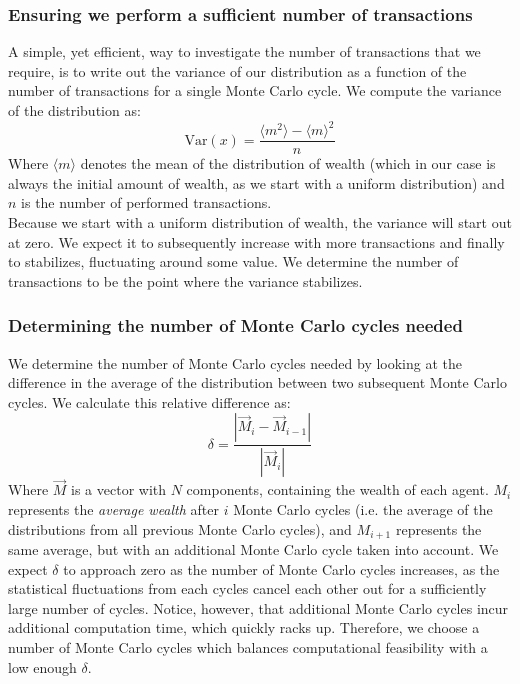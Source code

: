 \documentclass[a4paper, 10pt]{article}
\begin{document}
\subsubsection{Ensuring we perform a sufficient number of transactions}
A simple, yet efficient, way to investigate the number of transactions that we require, is to write out the variance of our distribution as a function of the number of transactions for a single Monte Carlo cycle. We compute the variance of the distribution as:
\begin{equation}
\mathrm{Var}(x)=\frac{\langle m^2 \rangle - \langle m \rangle^2 }{n}
\end{equation}
Where $\langle m \rangle$ denotes the mean of the distribution of wealth (which in our case is always the initial amount of wealth, as we start with a uniform distribution) and $n$ is the number of performed transactions.\\
\linebreak
Because we start with a uniform distribution of wealth, the variance will start out at zero. We expect it to subsequently increase with more transactions and finally to stabilizes, fluctuating around some value. We determine the number of transactions to be the point where the variance stabilizes.
\subsubsection{Determining the number of Monte Carlo cycles needed}
We determine the number of Monte Carlo cycles needed by looking at the difference in the average of the distribution between two subsequent Monte Carlo cycles. We calculate this relative difference as:
\begin{equation}\label{eq:Relative_diff_MC_steps}
\delta = \frac{|\vec{M}_{i}-\vec{M}_{i-1}|}{|\vec{M}_i|}
\end{equation}
Where $\vec{M}$ is a vector with $N$ components, containing the wealth of each agent. $M_i$ represents the \textit{average wealth} after $i$ Monte Carlo cycles (i.e. the average of the distributions from all previous Monte Carlo cycles), and $M_{i+1}$ represents the same average, but with an additional Monte Carlo cycle taken into account. We expect $\delta$ to approach zero as the number of Monte Carlo cycles increases, as the statistical fluctuations from each cycles cancel each other out for a sufficiently large number of cycles. Notice, however, that additional Monte Carlo cycles incur additional computation time, which quickly racks up. Therefore, we choose a number of Monte Carlo cycles which balances computational feasibility with a low enough $\delta$. 
\end{document}
